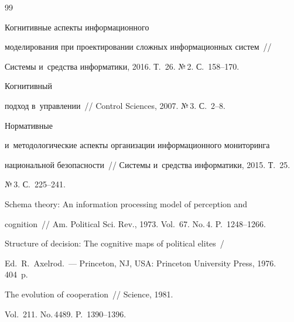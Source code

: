 {\small\frenchspacing


{%




\begin{thebibliography}{99}




 Когнитивные аспекты информационного 


моделирования при проектировании сложных информационных систем~/\!\!/ 


Системы и~средства информатики, 2016. Т.~26. №\,2. С.~158--170.




 Когнитивный 


подход в~управлении~/\!\!/ Control Sciences, 2007. №\,3. С.~2--8. 




 Нормативные 


и~методологические аспекты организации информационного мониторинга 


национальной безопасности~/\!\!/ Системы и~средства информатики, 2015. Т.~25. 


№\,3. С.~225--241.




 Schema theory: An information processing model of perception and 


cognition~/\!\!/ Am. Political Sci. Rev., 1973. Vol.~67. No.\,4. P.~1248--1266.







Structure of decision: The cognitive maps of political elites~/


Ed.\ R.~Axelrod.~--- Princeton, NJ, USA: Princeton University Press, 1976. 404~p.




 The evolution of cooperation~/\!\!/ Science, 1981. 


Vol.~211. No.\,4489. P.~1390--1396.










\end{thebibliography}}}
